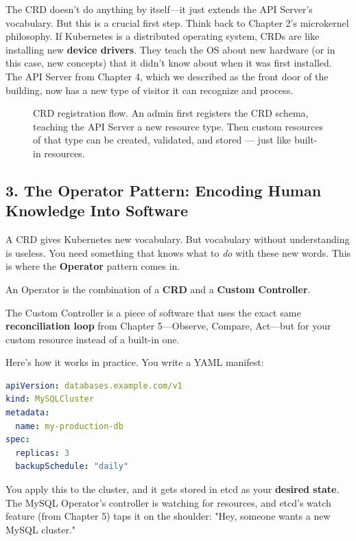 The CRD doesn't do anything by itself---it just extends the API Server's vocabulary. But this is a crucial first step. Think back to Chapter 2's microkernel philosophy. If Kubernetes is a distributed operating system, CRDs are like installing new \textbf{device drivers}. They teach the OS about new hardware (or in this case, new concepts) that it didn't know about when it was first installed. The API Server from Chapter 4, which we described as the front door of the building, now has a new type of visitor it can recognize and process.

\begin{figure}[htbp]
\centering

\caption{CRD registration flow. An admin first registers the CRD schema, teaching the API Server a new resource type. Then custom resources of that type can be created, validated, and stored --- just like built-in resources.}
\label{fig:6_1}
\end{figure}



\subsection{3. The Operator Pattern: Encoding Human Knowledge Into Software}


A CRD gives Kubernetes new vocabulary. But vocabulary without understanding is useless. You need something that knows what to \textit{do} with these new words. This is where the \textbf{Operator} pattern comes in.

An Operator is the combination of a \textbf{CRD} and a \textbf{Custom Controller}.

The Custom Controller is a piece of software that uses the exact same \textbf{reconciliation loop} from Chapter 5---Observe, Compare, Act---but for your custom resource instead of a built-in one.

Here's how it works in practice. You write a YAML manifest:

\begin{lstlisting}[language=yaml]
apiVersion: databases.example.com/v1
kind: MySQLCluster
metadata:
  name: my-production-db
spec:
  replicas: 3
  backupSchedule: "daily"
\end{lstlisting}


You apply this to the cluster, and it gets stored in etcd as your \textbf{desired state}. The MySQL Operator's controller is watching for  resources, and etcd's watch feature (from Chapter 5) taps it on the shoulder: "Hey, someone wants a new MySQL cluster."

